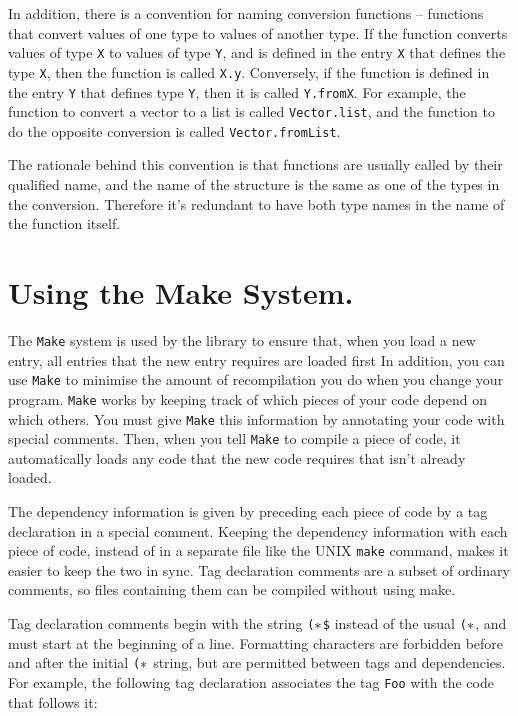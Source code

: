In addition, there is a convention for naming conversion functions --
functions that convert values of one type to values of another type.
If the function converts values of type {\tt X} to values of type
{\tt Y}, and is defined in the entry {\tt X} that defines the type {\tt X},
then the function is called {\tt X.y}.  Conversely, if the function is
defined in the entry {\tt Y} that defines type {\tt Y}, then it is called
{\tt Y.fromX}.  For example, the function to convert a vector to a list
is called {\tt Vector.list}, and the function to do the opposite conversion
is called {\tt Vector.fromList}.

The rationale behind this convention is that functions are usually
called by their qualified name, and the name of the structure is the same
as one of the types in the conversion.  Therefore it's redundant to
have both type names in the name of the function itself.

  
\section{Using the Make System.}	\label{make}

The {\tt Make} system is used by the library to ensure that, when you load
a new entry, all entries that the new entry requires are loaded first
In addition, you can use {\tt Make} to minimise the amount of recompilation
you do when you change your program.
{\tt Make} works by keeping track of which pieces of your code depend on
which others.  You must give {\tt Make} this information by annotating
your code with special comments.  Then, when you tell {\tt Make} to compile
a piece of code, it automatically loads any code that the new code requires
that isn't already loaded.

The dependency information is given by preceding each piece of code
by a tag declaration in a special comment.
Keeping the dependency information with each
piece of code, instead of in a separate file like the {\small UNIX}
{\tt make} command, makes it easier to keep the two in sync.
Tag declaration
comments are a subset of ordinary comments, so files containing them can
be compiled without using make.

Tag declaration comments begin with the string {\tt ($\mit\ast$\$} instead of
the usual {\tt ($\mit\ast$}, and must start at the beginning of a line.
Formatting
characters are forbidden before and after the initial {\tt ($\mit\ast$} string,
but
are permitted between tags and dependencies.
For example, the following tag declaration associates the tag {\tt Foo}
with
the code that follows it:

